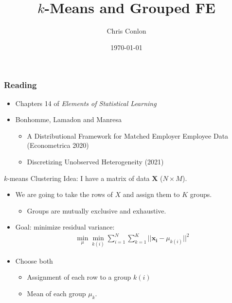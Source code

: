 \documentclass[xcolor=pdftex,dvipsnames,table,mathserif,aspectratio=169]{beamer}
\begin{document}
\title{$k$-Means and Grouped FE}
\author{Chris Conlon}
\date{\today}

\frame{\titlepage}


\begin{frame}
\frametitle{Reading}
\begin{itemize}
\item Chapters 14 of \textit{Elements of Statistical Learning}
\item Bonhomme, Lamadon and Manresa
\begin{itemize}
\item A Distributional Framework for Matched Employer Employee Data (Econometrica 2020)
\item Discretizing Unobserved Heterogeneity (2021)
\end{itemize}
\end{itemize}
\end{frame}


\begin{frame}{$k$-means Clustering}
Idea: I have a matrix of data $\mathbf{X}$ ($N \times M$). 
\begin{itemize}
\item We are going to take the rows of $X$ and assign them to $K$ groups.
\begin{itemize}
\item Groups are mutually exclusive and exhaustive.
\end{itemize}
\item Goal: minimize residual variance:
\begin{align*}
\min_{\mu} \min_{k(i)} \sum_{i=1}^N \sum_{k=1}^K || \mathbf{x_i} - \mu_{k(i)} ||^2
\end{align*}
\item Choose both
\begin{itemize}
\item Assignment of each row to a group $k(i)$
\item Mean of each group $\mu_k$.
\end{itemize}
\end{itemize}
\end{frame}
\end{document}
